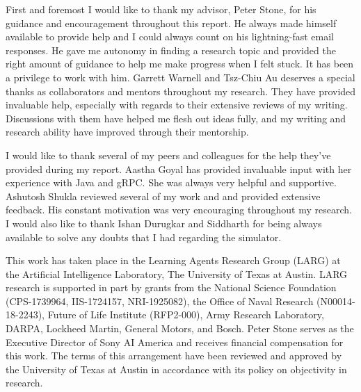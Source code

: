 \documentclass[12pt]{report}
\begin{document}
\justify 
\noindent

\thesiscopyrightpage                 

\thesiscertificationpage             

\thesistitlepage                     



\begin{thesisacknowledgments}       
First and foremost I would like to thank my advisor, Peter Stone, for his guidance and encouragement throughout this report. He always made himself available to provide help and I could always count on his lightning-fast email responses. He gave me autonomy in finding a research topic and provided the right amount of guidance to help me make progress when I felt stuck. It has been a privilege to work with him. Garrett Warnell and Tsz-Chiu Au deserves a special thanks as collaborators and mentors throughout my research. They have provided invaluable help, especially with regards to their extensive reviews of my writing. Discussions with them have helped me flesh out ideas fully, and my writing and research ability have improved through their mentorship.    

I would like to thank several of my peers and colleagues for the help they’ve provided during my report. Aastha Goyal has provided invaluable input with her experience with Java and gRPC. She was always very helpful and supportive. Ashutosh Shukla reviewed several of my work and and provided extensive feedback. His constant motivation was very encouraging throughout my research. I would also like to thank Ishan Durugkar and Siddharth for being always available to solve any doubts that I had regarding the simulator. 

This work has taken place in the Learning Agents Research Group (LARG) at the Artificial Intelligence Laboratory, The University of Texas at Austin.  LARG research is supported in part by grants from
the National Science Foundation (CPS-1739964, IIS-1724157, NRI-1925082), the Office of Naval Research (N00014-18-2243), Future of Life Institute (RFP2-000), Army Research Laboratory, DARPA, Lockheed
Martin, General Motors, and Bosch.  Peter Stone serves as the Executive Director of Sony AI America and receives financial compensation for this work.  The terms of this arrangement have been reviewed and approved by the University of Texas at Austin in accordance with its policy on objectivity in research. 

\end{thesisacknowledgments}          
\end{document}
